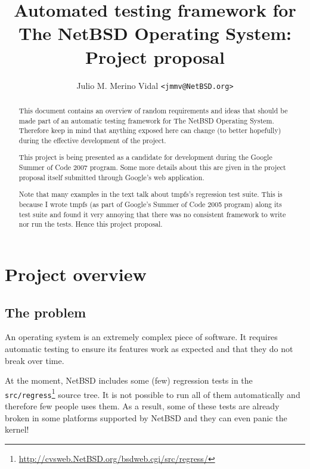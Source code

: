 \documentclass[a4paper,10pt]{article}
\title{Automated testing framework for \\ The NetBSD Operating System: \\
Project proposal}
\author{Julio M. Merino Vidal \texttt{<jmmv@NetBSD.org>}}
\begin{document}
\maketitle

\begin{abstract}

This document contains an overview of random requirements and ideas that
should be made part of an automatic testing framework for The NetBSD
Operating System.  Therefore keep in mind that anything exposed here can
change (to better hopefully) during the effective development of the
project.

This project is being presented as a candidate for development during the
Google Summer of Code 2007 program.  Some more details about this are given
in the project proposal itself submitted through Google's web application.

Note that many examples in the text talk about tmpfs's regression test
suite.  This is because I wrote tmpfs (as part of Google's Summer of Code
2005 program) along its test suite and found it very annoying that there
was no consistent framework to write nor run the tests.  Hence this project
proposal.

\end{abstract}


\section{Project overview}


\subsection{The problem}

An operating system is an extremely complex piece of software.  It
requires automatic testing to ensure its features work as expected and
that they do not break over time.

At the moment, NetBSD includes some (few) regression tests in the
\verb*|src/regress|\footnote{\url{
http://cvsweb.NetBSD.org/bsdweb.cgi/src/regress/}} source tree.  It is not
possible to run all of them automatically and therefore few people uses
them.  As a result, some of these tests are already broken in some
platforms supported by NetBSD and they can even panic the kernel!
\end{document}

